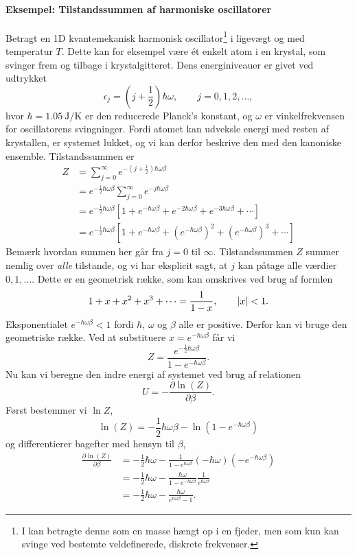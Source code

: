 \paragraph{Eksempel: Tilstandssummen af harmoniske oscillatorer}
Betragt en 1D kvantemekanisk harmonisk oscillator\footnote{I kan betragte denne som en masse hængt op i en fjeder, men som kun kan svinge ved bestemte veldefinerede, diskrete frekvenser.} i ligevægt og med temperatur $T$. Dette kan for eksempel være ét enkelt atom i en krystal, som svinger frem og tilbage i krystalgitteret. Dens energiniveauer er givet ved udtrykket
\[ \epsilon_j=(j+\frac{1}{2})\hbar\omega,\qquad j=0,1,2,\dots,\]
hvor $\hbar=\SI{1.05}{\joule\per\kelvin}$ er den reducerede Planck's konstant, og $\omega$ er vinkelfrekvensen for oscillatorens svingninger. Fordi atomet kan udveksle energi med resten af krystallen, er systemet lukket, og vi kan derfor beskrive den med den kanoniske ensemble. Tilstandssummen er
\begin{align*}
    Z&=\sum_{j=0}^\infty e^{-(j+\frac{1}{2})\hbar\omega\beta}\\
    &=e^{-\frac{1}{2}\hbar\omega\beta}\sum_{j=0}^\infty e^{-j\hbar\omega\beta}\\
    &=e^{-\frac{1}{2}\hbar\omega\beta}\left[1+e^{-\hbar\omega\beta}+e^{-2\hbar\omega\beta}+e^{-3\hbar\omega\beta}+\cdots\right]\\
    &=e^{-\frac{1}{2}\hbar\omega\beta}\left[1+e^{-\hbar\omega\beta}+\left(e^{-\hbar\omega\beta}\right)^2+\left(e^{-\hbar\omega\beta}\right)^3+\cdots\right]
\end{align*}
Bemærk hvordan summen her går fra $j=0$ til $\infty$. Tilstandssummen $Z$ summer nemlig over \emph{alle} tilstande, og vi har eksplicit sagt, at $j$ kan påtage alle værdier $0,1,\dots$. Dette er en geometrisk række, som kan omskrives ved brug af formlen
\[ 1+x+x^2+x^3+\cdots=\frac{1}{1-x},\qquad \abs{x}<1.\]
Eksponentialet $e^{-\hbar\omega\beta}<1$ fordi $\hbar$, $\omega$ og $\beta$ alle er positive. Derfor kan vi bruge den geometriske række. Ved at substituere $x=e^{-\hbar\omega\beta}$ får vi
\[ Z=\frac{e^{-\frac{1}{2}\hbar\omega\beta}}{1-e^{-\hbar\omega\beta}}. \]
Nu kan vi beregne den indre energi af systemet ved brug af relationen
\[ U=-\frac{\partial \ln (Z)}{\partial \beta}. \]
Først bestemmer vi $\ln Z$,
\[ \ln (Z)=-\frac{1}{2}\hbar\omega\beta-\ln(1-e^{-\hbar\omega\beta}) \]
og differentierer bagefter med hensyn til $\beta$,
\begin{align*} 
    \frac{\partial \ln (Z)}{\partial \beta}&=-\frac{1}{2}\hbar\omega-\frac{1}{1-e^{\hbar\omega\beta}}(-\hbar\omega)(-e^{-\hbar\omega\beta})\\
    &=-\frac{1}{2}\hbar\omega-\frac{\hbar\omega}{1-e^{-\hbar\omega\beta}}\frac{1}{e^{\hbar\omega\beta}}\\
    &=-\frac{1}{2}\hbar\omega-\frac{\hbar\omega}{e^{\hbar\omega\beta}-1}.
\end{align*}
